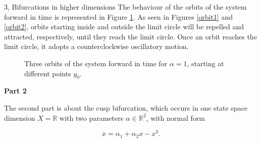 \documentclass[10pt,a4paper]{article}
\begin{document}
\begin{task}{3, Bifurcations in higher dimensions}
The behaviour of the orbits of the system forward in time is represented in Figure \ref{orbits}. As seen in Figures \ref{orbit1} and \ref{orbit2}, orbits starting inside and outside the limit circle will be repelled and attracted, respectively, until they reach the limit circle. Once an orbit reaches the limit circle, it adopts a counterclockwise oscillatory motion.

\begin{figure} [H]
    \centering
    \caption{Three orbits of the system forward in time for $\alpha=1$, starting at different points $y_0$.}
    \label{orbits}
\end{figure}

\noindent\textbf{Part 2}

The second part is about the cusp bifurcation, which occurs in one state space dimension $X=\mathbb{R}$ with two parameters $\alpha\in\mathbb{R}^2$, with normal form

\begin{equation}
    \dot{x} = \alpha_1 + \alpha_2 x - x^3.
\end{equation}


\end{task}
\end{document}
